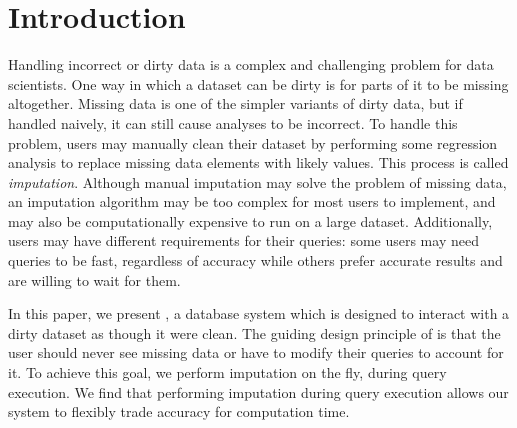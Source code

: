 \section{Introduction}

Handling incorrect or dirty data is a complex and challenging problem for data scientists.
One way in which a dataset can be dirty is for parts of it to be missing altogether.
Missing data is one of the simpler variants of dirty data, but if handled naively, it can still cause analyses to be incorrect.
To handle this problem, users may manually clean their dataset by performing some regression analysis to replace missing data elements with likely values.
This process is called \emph{imputation}.
Although manual imputation may solve the problem of missing data, an imputation algorithm may be too complex for most users to implement, and may also be computationally expensive to run on a large dataset.
Additionally, users may have different requirements for their queries: some users may need queries to be fast, regardless of accuracy while others prefer accurate results and are willing to wait for them.

In this paper, we present \ProjectName{}, a database system which is designed to interact with a dirty dataset as though it were clean.
The guiding design principle of \ProjectName{} is that the user should never see missing data or have to modify their queries to account for it.
To achieve this goal, we perform imputation on the fly, during query execution.
We find that performing imputation during query execution allows our system to flexibly trade accuracy for computation time.

